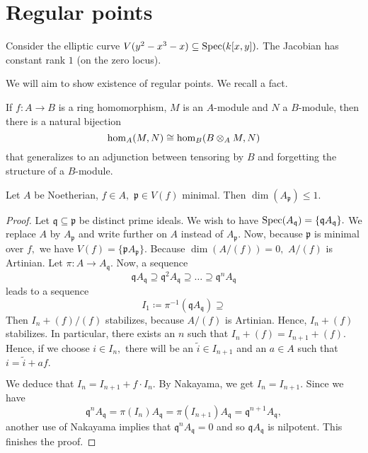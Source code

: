 \section{Regular points}

\begin{example}
  Consider the elliptic curve
  \(V(y^2-x^3-x) \subseteq \text{Spec}(k[x, y]).\)
  The Jacobian has constant rank \(1\) (on the zero locus).
\end{example}

We will aim to show existence of regular points. We recall a fact.
\begin{note}
  If \(f \colon A \to B\) is a ring homomorphism, \(M\) is an \(A\)-module and \(N\) a \(B\)-module, then there is a natural bijection
  \[\hom_A(M, N) \cong \hom_B(B \otimes_A M, N)\]
  that generalizes to an adjunction between tensoring by \(B\) and forgetting the structure of a \(B\)-module.
\end{note}

\begin{theorem}
  \label{krull's principal ideal theorem}
  Let \(A\) be Noetherian, \(f \in A,\) \(\mathfrak p \in V(f)\) minimal. Then \(\dim(A_{\mathfrak p}) \leq 1.\)
\end{theorem}
\begin{proof}
  Let \(\mathfrak q \subseteq \mathfrak p\) be distinct prime ideals. We wish to have
  \(\text{Spec}(A_{\mathfrak q}) = \{ \mathfrak q A_{\mathfrak q}\}.\)
  We replace \(A\) by \(A_{\mathfrak p}\) and write further on \(A\) instead of \(A_{\mathfrak p}.\)
  Now, because \(\mathfrak p\) is minimal over \(f,\) we have
  \(V(f) = \{\mathfrak p A_{\mathfrak p}\}.\)
  Because \(\dim(A/{(f)}) = 0,\) \(A/{(f)}\) is Artinian.
  Let \(\pi \colon A \to A_{\mathfrak q}.\) Now, a sequence
  \[\mathfrak q A_{\mathfrak q} \supseteq \mathfrak q^2 A_{\mathfrak q} \supseteq \dotso \supseteq \mathfrak q^n A_{\mathfrak q}\]
  leads to a sequence
  \[I_1 \coloneqq \pi^{-1}(\mathfrak q A_{\mathfrak q}) \supseteq\]
  Then \(I_n+(f)/{(f)}\) stabilizes, because \(A/{(f)}\) is Artinian. Hence, \(I_n + (f)\) stabilizes. In particular, there exists an \(n\) such that \(I_n + (f) = I_{n+1} + (f).\)
  Hence, if we choose \(i \in I_n,\) there will be an \(\tilde{i} \in I_{n+1}\) and an \(a \in A\) such that
  \(i = \tilde{i} + af.\)

  We deduce that \(I_n = I_{n+1} + f \cdot I_n\). By Nakayama,
  we get \(I_n = I_{n+1}.\)
  Since we have
  \[\mathfrak q^n A_{\mathfrak q} = \pi(I_n)A_{\mathfrak q} = \pi(I_{n+1}) A_{\mathfrak q} = \mathfrak q^{n+1} A_{\mathfrak q},\]
  another use of Nakayama implies that \(\mathfrak q^n A_{\mathfrak q} = 0\) and so \(\mathfrak q A_{\mathfrak q}\) is nilpotent.
  This finishes the proof.
\end{proof}

